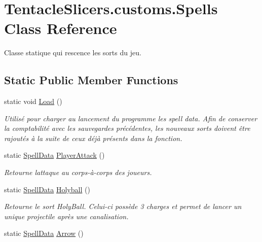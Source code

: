 \hypertarget{class_tentacle_slicers_1_1customs_1_1_spells}{}\section{Tentacle\+Slicers.\+customs.\+Spells Class Reference}
\label{class_tentacle_slicers_1_1customs_1_1_spells}


Classe statique qui rescence les sorts du jeu.  


\subsection*{Static Public Member Functions}
\begin{DoxyCompactItemize}
\item 
static void \hyperlink{class_tentacle_slicers_1_1customs_1_1_spells_aa6c96bd7d4dbfae6c4e007e5e1a6292c}{Load} ()
\begin{DoxyCompactList}\small\item\em Utilisé pour charger au lancement du programme les spell data. Afin de conserver la comptabilité avec les sauvegardes précédentes, les nouveaux sorts doivent être rajoutés à la suite de ceux déjà présents dans la fonction. \end{DoxyCompactList}\item 
static \hyperlink{class_tentacle_slicers_1_1spells_1_1_spell_data}{Spell\+Data} \hyperlink{class_tentacle_slicers_1_1customs_1_1_spells_a1400f7def2ffb9f09f8c171bea304af2}{Player\+Attack} ()
\begin{DoxyCompactList}\small\item\em Retourne l\textquotesingle{}attaque au corps-\/à-\/corps des joueurs. \end{DoxyCompactList}\item 
static \hyperlink{class_tentacle_slicers_1_1spells_1_1_spell_data}{Spell\+Data} \hyperlink{class_tentacle_slicers_1_1customs_1_1_spells_a6d0ec159b32ab1924fcceb617b801f57}{Holyball} ()
\begin{DoxyCompactList}\small\item\em Retourne le sort Holy\+Ball. Celui-\/ci possède 3 charges et permet de lancer un unique projectile après une canalisation. \end{DoxyCompactList}\item 
static \hyperlink{class_tentacle_slicers_1_1spells_1_1_spell_data}{Spell\+Data} \hyperlink{class_tentacle_slicers_1_1customs_1_1_spells_aeda241fbf33bfb1ba550917d0d9cdac4}{Arrow} ()

\end{DoxyCompactItemize}
